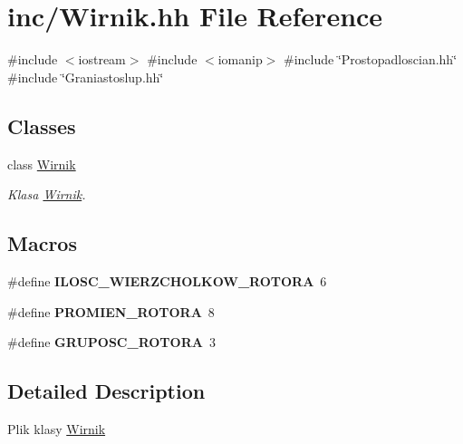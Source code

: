 \hypertarget{_wirnik_8hh}{}\section{inc/\+Wirnik.hh File Reference}
\label{_wirnik_8hh}
{\ttfamily \#include $<$iostream$>$}\newline
{\ttfamily \#include $<$iomanip$>$}\newline
{\ttfamily \#include \char`\"{}Prostopadloscian.\+hh\char`\"{}}\newline
{\ttfamily \#include \char`\"{}Graniastoslup.\+hh\char`\"{}}\newline
\subsection*{Classes}
\begin{DoxyCompactItemize}
\item 
class \mbox{\hyperlink{class_wirnik}{Wirnik}}
\begin{DoxyCompactList}\small\item\em Klasa \mbox{\hyperlink{class_wirnik}{Wirnik}}. \end{DoxyCompactList}\end{DoxyCompactItemize}
\subsection*{Macros}
\begin{DoxyCompactItemize}
\item 
\mbox{\label{_wirnik_8hh_abae7c8b9df013ee35369e1b9030bc6db}} 
\#define {\bfseries I\+L\+O\+S\+C\+\_\+\+W\+I\+E\+R\+Z\+C\+H\+O\+L\+K\+O\+W\+\_\+\+R\+O\+T\+O\+RA}~6
\item 
\mbox{\label{_wirnik_8hh_a479988a27345f3b401ca6b1bc118912c}} 
\#define {\bfseries P\+R\+O\+M\+I\+E\+N\+\_\+\+R\+O\+T\+O\+RA}~8
\item 
\mbox{\label{_wirnik_8hh_a41c9d9a825967e569eb1747306532760}} 
\#define {\bfseries G\+R\+U\+P\+O\+S\+C\+\_\+\+R\+O\+T\+O\+RA}~3
\end{DoxyCompactItemize}


\subsection{Detailed Description}
Plik klasy \mbox{\hyperlink{class_wirnik}{Wirnik}} 